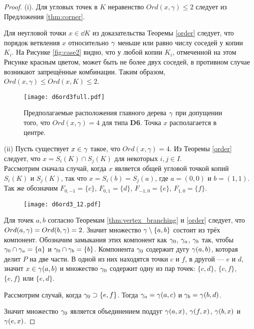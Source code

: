\begin{proof}
(i). Для угловых точек в $K$ неравенство $Ord(x,\gamma)\leq2$ следует из Предложения \ref{thm:corner}.

Для неугловой точки $x\in\dd K$ из доказательства Теоремы \ref{order} следует, что порядок ветвления $x$ относительно $\gamma$ меньше или равно числу соседей у копии $K_i$. 
На Рисунке \ref{fig:case2} видно, что у любой копии $K_i$, отмеченной на этом Рисунке красным цветом, может быть не более двух соседей, в противном случае возникают запрещённые комбинации. 
Таким образом, $Ord(x,\gamma)\leq Ord(x,K)\leq2$.

\begin{figure}[H]
    \centering
    \texttt{[image: d6ord3full.pdf]}
    \caption{ 
        Предполагаемые расположения главного дерева $\gamma$ при допущении того, что $Ord(x,\gamma)=4$ для типа {\bf D6}. Точка $x$ располагается в центре.}
    \label{fig:d6ord3full}
\end{figure}

(ii)  Пусть существует $x\in\gamma$ такое, что $Ord(x,\gamma)=4.$
Из Теоремы \ref{order} следует, что  $x=S_i(K)\cap S_j(K)$ для некоторых $i,j\in I$.\\
Рассмотрим сначала случай, когда $x$ является общей угловой точкой копий  $S_i(K)$ и $S_j(K)$, так что $x=S_i(b)=S_j(a)$, где $a=(0,0)$ и $b=(1,1)$. 
Так же обозначим $F_{0,-1}=\{c\}$, $F_{0,1}=\{d\}$, $F_{-1,0}=\{e\}$, $F_{1,0}=\{f\}$.

\begin{figure}[H]
    \centering \texttt{[image: d6ord3\_12.pdf]}
\end{figure}

Для точек $a,b$ согласно Теоремам \ref{thm:vertex_branching} и \ref{order} следует, что $Ord(a,\gamma)=Ord(b,\gamma)=2$. 
Значит множество $\gamma\setminus\{a,b\}$ состоит из трёх компонент. 
Обозначим замыкания этих компонент как $\gamma_0$, $\gamma_a$, $\gamma_b$ так, чтобы $\gamma_0\cap\gamma_a=\{a\}$ и $\gamma_0\cap \gamma_b=\{b\}$. 
Компонента $\gamma_0$ содержит дугу $\gamma(a,b)$, которая делит $P$ на две части. 
В одной из них находятся точки $c$ и $f$, в другой --- $e$ и $d$, значит $x\in \gamma(a,b)$ и множество $\gamma_0$ содержит одну из пар точек: $\{c,d\}$, $\{c,f\}$, $\{e,f\}$ или $\{e,d\}$.

Рассмотрим случай, когда $\gamma_0\supset\{e,f\}$. 
Тогда $\gamma_a=\gamma(a,c)$ и $\gamma_b=\gamma(b,d)$.

Значит множество $\gamma_0$ является объединением поддуг $\gamma(a,x)$, $\gamma(f,x)$, $\gamma(b,x)$ и $\gamma(e,x)$.


\end{proof}
